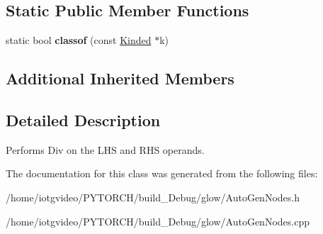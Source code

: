 \subsection*{Static Public Member Functions}
\begin{DoxyCompactItemize}
\item 
\mbox{\label{classglow_1_1_div_node_a718d5313b6a75de6b82e9baf05e64c79}} 
static bool {\bfseries classof} (const \hyperlink{classglow_1_1_kinded}{Kinded} $\ast$k)
\end{DoxyCompactItemize}
\subsection*{Additional Inherited Members}


\subsection{Detailed Description}
Performs Div on the L\+HS and R\+HS operands. 

The documentation for this class was generated from the following files\+:\begin{DoxyCompactItemize}
\item 
/home/iotgvideo/\+P\+Y\+T\+O\+R\+C\+H/build\+\_\+\+Debug/glow/Auto\+Gen\+Nodes.\+h\item 
/home/iotgvideo/\+P\+Y\+T\+O\+R\+C\+H/build\+\_\+\+Debug/glow/Auto\+Gen\+Nodes.\+cpp\end{DoxyCompactItemize}
